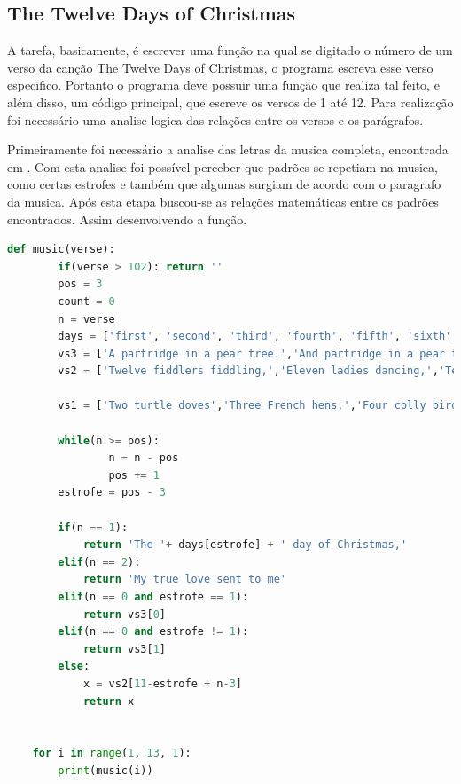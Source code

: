 \subsection{The Twelve Days of Christmas}

A tarefa, basicamente, é escrever uma função na qual se digitado o número de um verso da canção The Twelve Days of Christmas, o programa escreva esse verso especifico. Portanto o programa deve possuir uma função que realiza tal feito, e além disso, um código principal, que escreve os versos de 1 até 12. Para realização foi necessário uma analise logica das relações entre os versos e os parágrafos.

Primeiramente foi necessário a analise das letras da musica completa, encontrada em \cite{TheTwelv3:online}. Com esta analise foi possível perceber que padrões se repetiam na musica, como certas estrofes e também que algumas surgiam de acordo com o paragrafo da musica. Após esta etapa buscou-se as relações matemáticas entre os padrões encontrados. Assim desenvolvendo a função.

\begin{lstlisting}[language=Python]
    def music(verse):
        if(verse > 102): return ''
        pos = 3
        count = 0
        n = verse
        days = ['first', 'second', 'third', 'fourth', 'fifth', 'sixth', 'seventh', 'eighth', 'ninth', 'tenth', 'eleventh','twelfth']
        vs3 = ['A partridge in a pear tree.','And partridge in a pear tree.']
        vs2 = ['Twelve fiddlers fiddling,','Eleven ladies dancing,','Ten pipers piping,','Nine drummers drumming,','Eight maids a-milking,','Seven swans a-swimming,','Six geese a-laying,','Five gold rings,','Four colly birds,','Three French hens,','Two turtle doves']
        
        vs1 = ['Two turtle doves','Three French hens,','Four colly birds,','Five gold rings,','Six geese a-laying,','Seven swans a-swimming,','Eight maids a-milking,','Nine drummers drumming,','Ten pipers piping,','Eleven ladies dancing,','Twelve fiddlers fiddling,']
        
        while(n >= pos):
                n = n - pos
                pos += 1
        estrofe = pos - 3

        if(n == 1):
            return 'The '+ days[estrofe] + ' day of Christmas,'
        elif(n == 2):
            return 'My true love sent to me'
        elif(n == 0 and estrofe == 1):
            return vs3[0]
        elif(n == 0 and estrofe != 1):
            return vs3[1]
        else:
            x = vs2[11-estrofe + n-3]
            return x


    for i in range(1, 13, 1):
        print(music(i))

\end{lstlisting}

